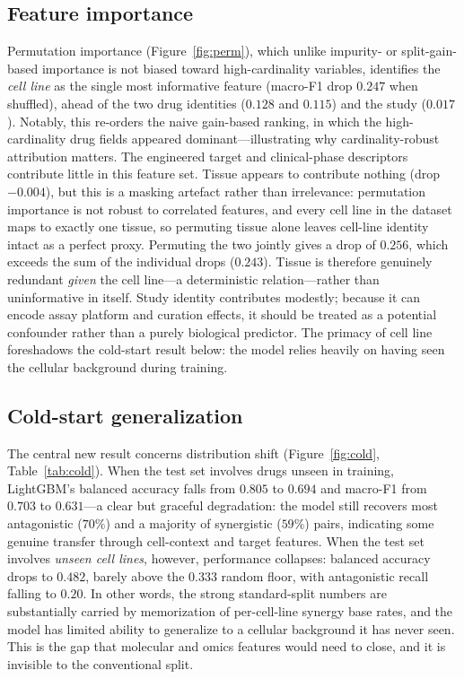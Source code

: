 \documentclass{bmcart}
\begin{document}
\subsection*{Feature importance}
Permutation importance (Figure~\ref{fig:perm}), which unlike impurity- or split-gain-based importance
is not biased toward high-cardinality variables, identifies the
\emph{cell line} as the single most informative feature (macro-F1 drop $0.247$ when shuffled), ahead
of the two drug identities ($0.128$ and $0.115$) and the study ($0.017$). Notably, this re-orders the
naive gain-based ranking, in which the high-cardinality drug fields appeared dominant---illustrating
why cardinality-robust attribution matters. The engineered target and clinical-phase descriptors
contribute little in this feature set. Tissue appears to contribute nothing (drop $-0.004$), but this
is a masking artefact rather than irrelevance: permutation importance is not robust to correlated
features, and every cell line in the dataset maps to exactly one tissue, so permuting tissue alone
leaves cell-line identity intact as a perfect proxy. Permuting the two jointly gives a drop of $0.256$,
which exceeds the sum of the individual drops ($0.243$). Tissue is therefore genuinely redundant
\emph{given} the cell line---a deterministic relation---rather than uninformative in itself. Study
identity contributes modestly; because it can encode assay platform and curation effects, it should be
treated as a potential confounder rather than a purely biological predictor. The primacy of cell line
foreshadows the cold-start result below: the model relies heavily on having seen the cellular
background during training.

\subsection*{Cold-start generalization}
The central new result concerns distribution shift (Figure~\ref{fig:cold}, Table~\ref{tab:cold}). When
the test set involves drugs unseen in training, LightGBM's balanced accuracy falls from $0.805$ to
$0.694$ and macro-F1 from $0.703$ to $0.631$---a clear but graceful degradation: the model still
recovers most antagonistic ($70\%$) and a majority of synergistic ($59\%$) pairs, indicating some
genuine transfer through cell-context and target features. When the test set involves \emph{unseen
cell lines}, however, performance collapses: balanced accuracy drops to $0.482$, barely above the
$0.333$ random floor, with antagonistic recall falling to $0.20$. In other words, the strong
standard-split numbers are substantially carried by memorization of per-cell-line synergy base rates,
and the model has limited ability to generalize to a cellular background it has never seen. This is the
gap that molecular and omics features would need to close, and it is invisible to the conventional
split.
\end{document}
